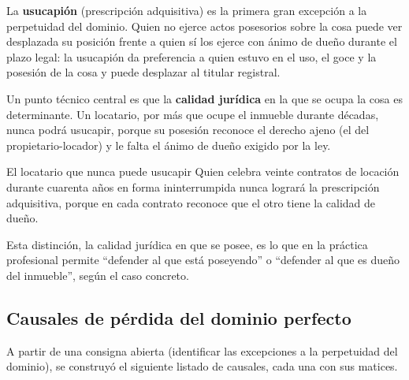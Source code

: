 \documentclass[12pt,oneside]{book}
\begin{document}
La \textbf{usucapión} (prescripción adquisitiva) es la primera gran excepción a la perpetuidad del dominio. Quien no ejerce actos posesorios sobre la cosa puede ver desplazada su posición frente a quien sí los ejerce con ánimo de dueño durante el plazo legal: la usucapión da preferencia a quien estuvo en el uso, el goce y la posesión de la cosa y puede desplazar al titular registral.

Un punto técnico central es que la \textbf{calidad jurídica} en la que se ocupa la cosa es determinante. Un locatario, por más que ocupe el inmueble durante décadas, nunca podrá usucapir, porque su posesión reconoce el derecho ajeno (el del propietario-locador) y le falta el ánimo de dueño exigido por la ley.

\begin{example}{El locatario que nunca puede usucapir}
Quien celebra veinte contratos de locación durante cuarenta años en forma ininterrumpida nunca logrará la prescripción adquisitiva, porque en cada contrato reconoce que el otro tiene la calidad de dueño.
\end{example}

Esta distinción, la calidad jurídica en que se posee, es lo que en la práctica profesional permite ``defender al que está poseyendo'' o ``defender al que es dueño del inmueble'', según el caso concreto.

\subsection{Causales de pérdida del dominio perfecto}

A partir de una consigna abierta (identificar las excepciones a la perpetuidad del dominio), se construyó el siguiente listado de causales, cada una con sus matices.
\end{document}

